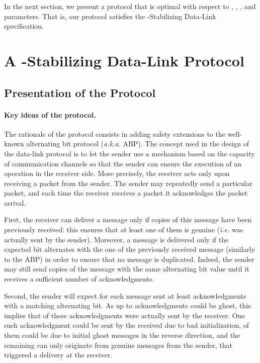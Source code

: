 \documentclass[11pt]{article}
\begin{document}
In the next section, we present a protocol that is optimal with respect to , , , and  parameters. That is, our protocol satisfies the -Stabilizing Data-Link specification.

\section{A -Stabilizing Data-Link Protocol}\label{sec:solution}

\subsection{Presentation of the Protocol}

\paragraph{Key ideas of the protocol.} The rationale of the protocol consists in adding safety extensions to the well-known alternating bit protocol (\emph{a.k.a.} ABP). The concept used in the design of the data-link protocol is to let the sender use a mechanism based on the capacity  of communication channels so that the sender can ensure the execution of an operation in the receiver side. More precisely, the receiver acts only upon receiving a packet from the sender. The sender may repeatedly send a particular packet, and each time the receiver receives a packet it acknowledges the packet arrival.

First, the receiver can deliver a message only if  copies of this message have been previously received: this ensures that at least one of them is genuine (\emph{i.e.} was actually sent by the sender). Moreover, a message is delivered only if the expected bit alternates with the one of the previously received message (similarly to the ABP) in order to ensure that no message is duplicated. Indeed, the sender may still send copies of the message with the same alternating bit value until it receives a sufficient number of acknowledgments. 

Second, the sender will expect for each message sent at least  acknowledgments with a matching alternating bit. As up to  acknowledgments could be ghost, this implies that  of these acknowledgments were actually sent by the receiver. One such acknowledgment could be sent by the received due to bad initialization,  of them could be due to  initial ghost messages in the reverse direction, and the remaining  can only originate from genuine messages from the sender, that triggered a delivery at the receiver. 
\end{document}

